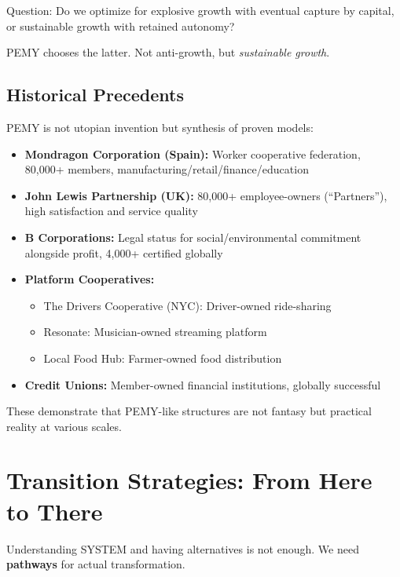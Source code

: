 \documentclass[11pt,a4paper]{article}
\theoremstyle{definition}
\theoremstyle{remark}
\begin{document}
Question: Do we optimize for explosive growth with eventual capture by capital, or sustainable growth with retained autonomy?

PEMY chooses the latter. Not anti-growth, but \textit{sustainable growth}.

\subsection{Historical Precedents}

PEMY is not utopian invention but synthesis of proven models:

\begin{itemize}
    \item \textbf{Mondragon Corporation (Spain):} Worker cooperative federation, 80,000+ members, manufacturing/retail/finance/education
    
    \item \textbf{John Lewis Partnership (UK):} 80,000+ employee-owners (``Partners''), high satisfaction and service quality
    
    \item \textbf{B Corporations:} Legal status for social/environmental commitment alongside profit, 4,000+ certified globally
    
    \item \textbf{Platform Cooperatives:}
    \begin{itemize}
        \item The Drivers Cooperative (NYC): Driver-owned ride-sharing
        \item Resonate: Musician-owned streaming platform
        \item Local Food Hub: Farmer-owned food distribution
    \end{itemize}
    
    \item \textbf{Credit Unions:} Member-owned financial institutions, globally successful
\end{itemize}

These demonstrate that PEMY-like structures are not fantasy but practical reality at various scales.

\section{Transition Strategies: From Here to There}

Understanding SYSTEM and having alternatives is not enough. We need \textbf{pathways} for actual transformation.
\end{document}

